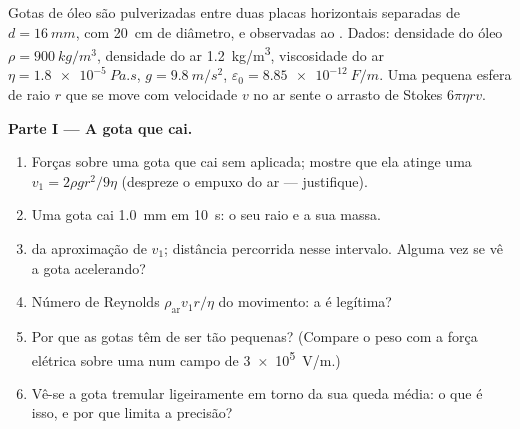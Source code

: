 \begin{problem}
\label{pb:b1:potential-capacitors:1}
Gotas de óleo são pulverizadas entre duas placas horizontais separadas de $d = \qty{16}{mm}$,
com \qty{20}{cm} de diâmetro, e observadas ao .
Dados: densidade do óleo $\rho = \qty{900}{kg/m^3}$, densidade do ar
\qty{1.2}{kg/m^3}, viscosidade do ar $\eta = \qty{1.8e-5}{Pa.s}$, $g =
\qty{9.8}{m/s^2}$, $\varepsilon_0 = \qty{8.85e-12}{F/m}$. Uma pequena esfera de
raio $r$ que se move com velocidade $v$ no ar sente o arrasto de Stokes $6\pi\eta rv$.

\medskip
\noindent\textbf{Parte I --- A gota que cai.}
\begin{enumerate}
  \item Forças sobre uma gota que cai sem  aplicada; mostre que ela
        atinge uma  $v_1 = 2\rho gr^2/9\eta$ (despreze o
        empuxo do ar --- justifique).
  \item Uma gota cai \qty{1.0}{mm} em \qty{10}{s}: o seu raio e a sua massa.
  \item {} da aproximação de $v_1$; distância percorrida
        nesse intervalo. Alguma vez se vê a gota acelerando?
  \item Número de Reynolds $\rho_{\text{ar}}v_1r/\eta$ do movimento: a  é legítima?
  \item Por que as gotas têm de ser tão pequenas? (Compare o peso com a
        força elétrica sobre uma  num campo de
        \qty{3e5}{V/m}.)
  \item Vê-se a gota tremular ligeiramente em torno da sua queda média: o que
        é isso, e por que limita a precisão?
\end{enumerate}


\end{problem}

